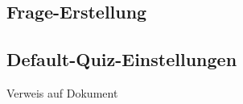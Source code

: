 \subsection{Frage-Erstellung}








\subsection{Default-Quiz-Einstellungen}
Verweis auf Dokument



